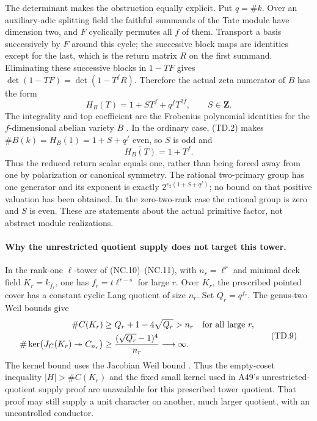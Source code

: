 The determinant makes the obstruction equally explicit.
Put $q=\#k$. Over an auxiliary-adic splitting field the
faithful summands of the Tate module have dimension two,
and $F$ cyclically permutes all $f$ of them.
Transport a basis successively by $F$ around this cycle;
the successive block maps are identities except for the last,
which is the return matrix $R$ on the first summand.
Eliminating these successive blocks in $1-TF$ gives
$\det(1-TF)=\det(1-T^fR)$. Therefore the
actual zeta numerator of $B$ has the form
\[
                       H_B(T)=1+S T^f+q^fT^{2f},\qquad S\in\mathbf Z.
 \tag{TD.7}
\]
The integrality and top coefficient are the Frobenius
polynomial identities for the $f$-dimensional abelian variety
$B$ \cite[Theorem~19.1]{MilneAV}.
In the ordinary case, (TD.2) makes
$\#B(k)=H_B(1)=1+S+q^f$ even, so $S$ is odd and
\[
                        \overline{H_B(T)}=1+T^f.
 \tag{TD.8}
\]
Thus the reduced return scalar equals one, rather than being
forced away from one by polarization or canonical symmetry.
The rational two-primary group has one generator and its
exponent is exactly
$2^{v_2(1+S+q^f)}$; no bound on that positive valuation has
been obtained. In the zero-two-rank case the rational group
is zero and $S$ is even. These are statements about the
actual primitive factor, not abstract module realizations.

\paragraph{Why the unrestricted quotient supply does not target this tower.}
In the rank-one $\ell$-tower of (NC.10)--(NC.11), with
$n_r=\ell^r$ and minimal deck field $K_r=k_{f_r}$,
one has $f_r=t\ell^{r-s}$ for large $r$.
Over $K_r$, the prescribed pointed cover has a constant
cyclic Lang quotient of size $n_r$.
Set $Q_r=q^{f_r}$. The genus-two Weil bounds give
\cite[Theorem~11.1]{MilneJV}
\[
\begin{aligned}
 \#C(K_r)&\ge Q_r+1-4\sqrt{Q_r}>n_r
                                      &&\hbox{for all large }r,\\
 \#\ker\bigl(J_C(K_r)\twoheadrightarrow C_{n_r}\bigr)
   &\ge\frac{(\sqrt{Q_r}-1)^4}{n_r}\longrightarrow\infty.
\end{aligned}
 \tag{TD.9}
\]
The kernel bound uses the Jacobian Weil bound
\cite[Theorem~19.1]{MilneAV}.
Thus the empty-coset inequality $|H|>\#C(K_r)$ and the fixed
small kernel used in A49's unrestricted-quotient supply proof
are unavailable for this prescribed tower quotient.
That proof may still supply a unit character on another,
much larger quotient, with an uncontrolled conductor.

